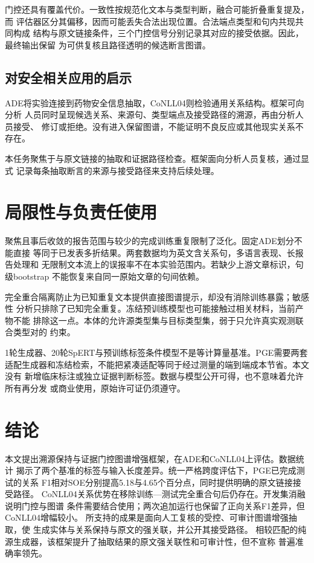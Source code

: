 \documentclass[12pt,a4paper,fontset=none]{ctexart}
\begin{document}
门控还具有覆盖代价。一致性按规范化文本与类型判断，融合可能折叠重复提及，而
评估器区分其偏移，因而可能丢失合法出现位置。合法端点类型和句内共现共同构成
结构与原文链接条件，三个门控信号分别记录其对应的接受依据。因此，最终输出保留
为可供复核且路径透明的候选断言图谱。

\subsection{对安全相关应用的启示}
ADE将实验连接到药物安全信息抽取，CoNLL04则检验通用关系结构。框架可向分析
人员同时呈现候选关系、来源句、类型端点及接受路径的溯源，再由分析人员接受、
修订或拒绝。没有进入保留图谱，不能证明不良反应或其他现实关系不存在。

本任务聚焦于与原文链接的抽取和证据路径检查。框架面向分析人员复核，通过显式
记录每条抽取断言的来源与接受路径来支持后续处理。

\section{局限性与负责任使用}
\label{sec:limitations}
聚焦且事后收敛的报告范围与较少的完成训练重复限制了泛化。固定ADE划分不能直接
等同于已发表多折结果。两套数据均为英文含关系句，多语言表现、长报告处理和
无限制文本流上的误报率不在本实验范围内。若缺少上游文章标识，句级bootstrap
不能恢复来自同一原始文章的句间依赖。

完全重合隔离防止为已知重复文本提供直接图谱提示，却没有消除训练暴露；敏感性
分析只排除了已知完全重复。冻结预训练模型也可能接触过相关材料，当前产物不能
排除这一点。本体的允许源类型集与目标类型集，弱于只允许真实观测联合类型对的
约束。

1轮生成器、20轮SpERT与预训练标签条件模型不是等计算量基准。PGE需要两套
适配生成器和冻结检索，不能把紧凑适配等同于经过测量的端到端成本节省。本文没有
新增临床标注或独立证据判断标签。数据与模型公开可得，也不意味着允许所有再分发
或商业使用，原始许可证仍须遵守。

\section{结论}
\label{sec:conclusion}
本文提出溯源保持与证据门控图谱增强框架，在ADE和CoNLL04上评估。数据统计
揭示了两个基准的标签与输入长度差异。统一严格跨度评估下，PGE已完成测试的关系
F1相对SOE分别提高5.18与4.65个百分点，同时提供明确的原文链接接受路径。
CoNLL04关系优势在移除训练—测试完全重合句后仍存在。开发集消融说明门控与图谱
条件需要结合使用；两次追加运行也保留了正向关系F1差异，但CoNLL04增幅较小。
所支持的成果是面向人工复核的受控、可审计图谱增强抽取，使
生成实体与关系保持与原文的强关联，并公开其接受路径。
相较匹配的纯源生成器，该框架提升了抽取结果的原文强关联性和可审计性，但不宣称
普遍准确率领先。
\end{document}

